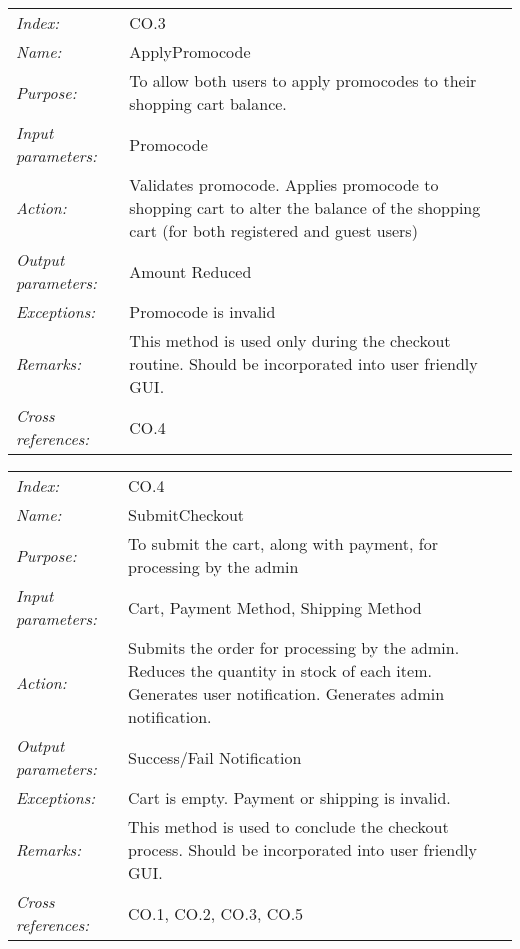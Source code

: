 \documentclass[10pt,letter]{article}
\begin{document}
\begin{tabularx}{\textwidth}{l X}
    \it{Index:} & CO.3 \\
    \it{Name:} & ApplyPromocode \\
    \it{Purpose:} & To allow both users to apply promocodes to their shopping cart balance. \\
    \it{Input parameters:} & Promocode \\
    \it{Action:} & Validates promocode. Applies promocode to shopping cart to alter the balance of the shopping cart (for both registered and guest users)\\
    \it{Output parameters:} & Amount Reduced  \\
    \it{Exceptions:} & Promocode is invalid\\
    \it{Remarks:} & This method is used only during the checkout routine. Should be incorporated into user friendly GUI.\\
    \it{Cross references:} & CO.4 \\
    \hline
\end{tabularx}

\begin{tabularx}{\textwidth}{l X}
    \it{Index:} & CO.4 \\
    \it{Name:} &  SubmitCheckout\\
    \it{Purpose:} &  To submit the cart, along with payment, for processing by the admin\\
    \it{Input parameters:} & Cart, Payment Method, Shipping Method \\
    \it{Action:} & Submits the order for processing by the admin. Reduces the quantity in stock of each item. Generates user notification. Generates admin notification. \\
    \it{Output parameters:} & Success/Fail Notification \\
    \it{Exceptions:} & Cart is empty. Payment or shipping is invalid. \\
    \it{Remarks:} & This method is used to conclude the checkout process. Should be incorporated into user friendly GUI.\\
    \it{Cross references:} & CO.1, CO.2, CO.3, CO.5 \\
    \hline
\end{tabularx}
\end{document}
